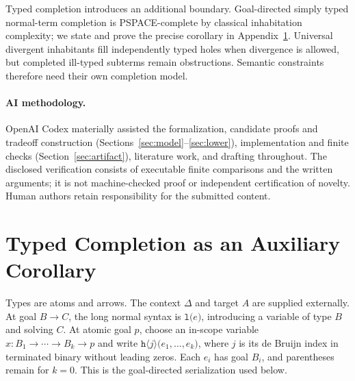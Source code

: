 \documentclass[manuscript,screen,11pt,nonacm]{acmart}
\theoremstyle{definition}\newtheorem{definition}{Definition}
\begin{document}
Typed completion introduces an additional boundary. Goal-directed simply typed normal-term completion is PSPACE-complete by classical inhabitation complexity; we state and prove the precise corollary in Appendix~\ref{sec:types}. Universal divergent inhabitants fill independently typed holes when divergence is allowed, but completed ill-typed subterms remain obstructions. Semantic constraints therefore need their own completion model.

\paragraph{AI methodology.}
OpenAI Codex materially assisted the formalization, candidate proofs and tradeoff construction (Sections~\ref{sec:model}--\ref{sec:lower}), implementation and finite checks (Section~\ref{sec:artifact}), literature work, and drafting throughout. The disclosed verification consists of executable finite comparisons and the written arguments; it is not machine-checked proof or independent certification of novelty. Human authors retain responsibility for the submitted content.

\appendix
\section{Typed Completion as an Auxiliary Corollary}\label{sec:types}
Types are atoms and arrows. The context $\Delta$ and target $A$ are supplied externally. At goal $B\to C$, the long normal syntax is $\mathtt{l(}e\mathtt{)}$, introducing a variable of type $B$ and solving $C$. At atomic goal $p$, choose an in-scope variable $x:B_1\to\cdots\to B_k\to p$ and write $\mathtt{h}\langle j\rangle\mathtt{(}e_1,\ldots,e_k\mathtt{)}$, where $j$ is its de Bruijn index in terminated binary without leading zeros. Each $e_i$ has goal $B_i$, and parentheses remain for $k=0$. This is the goal-directed serialization used below.
\end{document}
